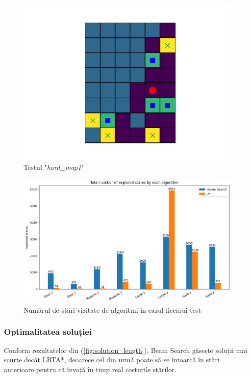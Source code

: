 \documentclass{article}
\begin{document}
\begin{figure}[ht]
    \begin{center}
        \includegraphics[scale=0.4]{hard_map1.png}
    \end{center}
    \caption{Testul "\textit{hard\_map1}"}
    \label{fig:hard_map1}
\end{figure}

\begin{figure}[ht]
    \includegraphics[scale=0.55]{solution/explored_states.png}
    \caption{Numărul de stări vizitate de algoritmi în cazul fiecărui test}
    \label{fig:explored_states}
\end{figure}

\subsubsection*{Optimalitatea soluției}
Conform rezultatelor din (\ref{fig:solution_length}), Beam Search găsește 
soluții mai scurte decât LRTA*, deoarece cel din urmă poate să se întoarcă în 
stări anterioare pentru că învață în timp real costurile stărilor. 
\end{document}
